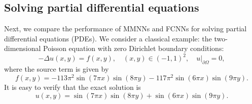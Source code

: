 \documentclass[review,hidelinks,onefignum,onetabnum]{siamart250211}
\begin{document}





\subsection{Solving partial differential equations}
\label{sec:PDE}


Next, we compare the performance of MMNNs and FCNNs for solving partial differential equations (PDEs).  
We consider a classical example: the two-dimensional Poisson equation with zero Dirichlet boundary conditions:
\[
-\Delta u(x, y) = f(x, y), \quad (x, y) \in (-1,1)^2,\quad u|_{\partial \Omega} = 0,
\]
where the source term is given by
\[
f(x,y) = -113\pi^2\sin(7\pi x)\sin(8\pi y) - 117\pi^2\sin(6\pi x)\sin(9\pi y).
\]
It is easy to verify that the exact solution is
\[
u(x,y) = \sin(7\pi x)\sin(8\pi y) + \sin(6\pi x)\sin(9\pi y).
\]
\end{document}
